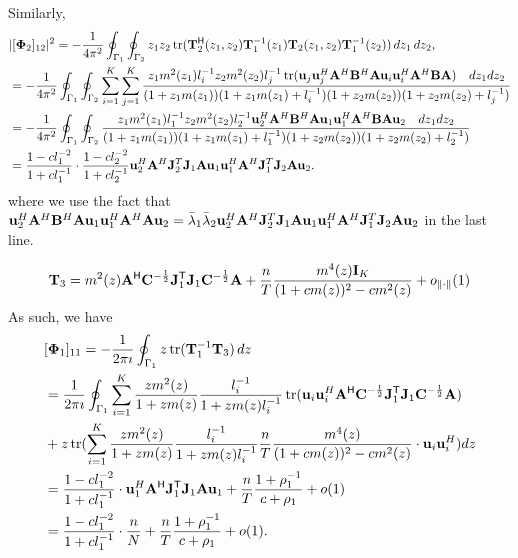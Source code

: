 \documentclass[11pt,a4paper]{article}
\begin{document}
Similarly,
\begin{align*}
    &|[{\boldsymbol{\Phi}}_2]_{12}|^2 = -\frac1{4 \pi^2} \oint_{\Gamma_1} \oint_{\Gamma_2} z_1 z_2 \operatorname{tr} ( \mathbf{T}_2^{\sf H}(z_1,z_2) \mathbf{T}_1^{-1}(z_1) \mathbf{T}_2(z_1,z_2) \mathbf{T}_1^{-1}(z_2) )\,dz_1\,dz_2, \\ 
    &= -\frac1{4 \pi^2} \oint_{\Gamma_1} \oint_{\Gamma_2} \sum_{i=1}^K \sum_{j=1}^K \frac{z_1 m^2(z_1) l_i^{-1} z_2 m^2(z_2)l_j^{-1} \operatorname{tr}(\mathbf{u}_j \mathbf{u}_j^H {\mathbf{A}}^H {\mathbf{B}}^H {\mathbf{A}} \mathbf{u}_i \mathbf{u}_i^H {\mathbf{A}}^H {\mathbf{B}} {\mathbf{A}} ) \quad dz_1 dz_2 }{(1+z_1m(z_1))(1+z_1m(z_1)+l_i^{-1})(1+z_2m(z_2))(1+z_2m(z_2)+l_j^{-1})} \\
    &= -\frac1{4 \pi^2} \oint_{\Gamma_1} \oint_{\Gamma_2} \frac{z_1 m^2(z_1) l_1^{-1} z_2 m^2(z_2) l_2^{-1}  \mathbf{u}_2^H {\mathbf{A}}^H {\mathbf{B}}^H {\mathbf{A}} \mathbf{u}_1 \mathbf{u}_1^H {\mathbf{A}}^H {\mathbf{B}} {\mathbf{A}} \mathbf{u}_2 \quad dz_1 dz_2}{(1+z_1m(z_1))(1+z_1m(z_1)+l_1^{-1})(1+z_2m(z_2))(1+z_2m(z_2)+l_2^{-1})} \\
    &= \frac{1- c l_1^{-2}}{ 1 + c l_1^{-1} } \cdot \frac{1- c l_2^{-2}}{ 1 + c l_2^{-1} }  \mathbf{u}_2^H {\mathbf{A}}^H {\mathbf{J}}_2^T {\mathbf{J}}_1 {\mathbf{A}} \mathbf{u}_1 \mathbf{u}_1^H {\mathbf{A}}^H {\mathbf{J}}_1^T {\mathbf{J}}_2 {\mathbf{A}} \mathbf{u}_2.
\end{align*}
where we use the fact that $\mathbf{u}_2^H {\mathbf{A}}^H {\mathbf{B}}^H {\mathbf{A}} \mathbf{u}_1 \mathbf{u}_1^H {\mathbf{A}}^H {\mathbf{A}} \mathbf{u}_2=\bar \lambda_1 \bar \lambda_2  \mathbf{u}_2^H {\mathbf{A}}^H {\mathbf{J}}_2^T {\mathbf{J}}_1 {\mathbf{A}} \mathbf{u}_1 \mathbf{u}_1^H {\mathbf{A}}^H {\mathbf{J}}_1^T {\mathbf{J}}_2 {\mathbf{A}} \mathbf{u}_2$
in the last line.

\begin{align*}
    \mathbf{T}_3 = m^2(z) {\mathbf{A}}^{\sf H} {\mathbf{C}}^{-\frac12} {\mathbf{J}}_1^{\sf T} {\mathbf{J}}_1 {\mathbf{C}}^{-\frac12} {\mathbf{A}} + \frac{n}T \frac{m^4(z) \mathbf{I}_K}{(1+cm(z))^2-cm^2(z)}  + o_{\| \cdot \|}(1)
\end{align*}
As such, we have
\begin{align*}
    &[{\boldsymbol{\Phi}}_1]_{11} = -\frac1{2 \pi \imath} \oint_{\Gamma_1} z \operatorname{tr} (  \mathbf{T}_1^{-1} \mathbf{T}_3 )\,dz \\
    &= \frac1{2 \pi \imath} \oint_{\Gamma_1}\sum_{i=1}^{K} \frac{zm^2(z)}{1+zm(z)} \frac{l_i^{-1}}{1+zm(z)l_i^{-1}} \operatorname{tr}(\mathbf{u}_i \mathbf{u}_i^H 
     {\mathbf{A}}^{\sf H} {\mathbf{C}}^{-\frac12} {\mathbf{J}}_1^{\sf T} {\mathbf{J}}_1 {\mathbf{C}}^{-\frac12} {\mathbf{A}} ) \\
     & + z \operatorname{tr}(\sum_{i=1}^{K} \frac{zm^2(z)}{1+zm(z)} \frac{l_i^{-1}}{1+zm(z)l_i^{-1}} \frac{n}T \frac{m^4(z)}{(1+cm(z))^2-cm^2(z)} \cdot \mathbf{u}_i \mathbf{u}_i^H) dz \\
     &= \frac{1- c l_1^{-2}}{ 1 + c l_1^{-1} } \cdot \mathbf{u}_1^H {\mathbf{A}}^{\sf H} {\mathbf{J}}_1^{\sf T} {\mathbf{J}}_1 {\mathbf{A}} \mathbf{u}_1 + \frac{n}T \frac{1+\rho_1^{-1}}{c+\rho_1} + o(1) \\
     &= \frac{1- c l_1^{-2}}{ 1 + c l_1^{-1} } \cdot \frac{n}{N}+ \frac{n}T \frac{1+\rho_1^{-1}}{c+\rho_1} + o(1).
\end{align*}
\end{document}
